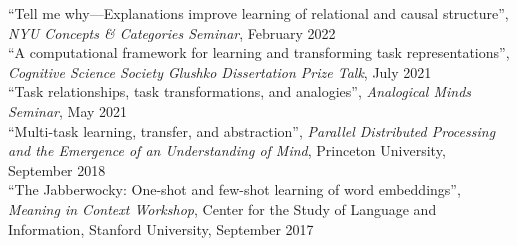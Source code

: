 \documentclass[margin]{res}
\begin{document}
\begin{resume}
{``Tell me why---Explanations improve learning of relational and causal structure'',} \textit{NYU Concepts \& Categories Seminar}, February 2022\\[3pt] 
{``A computational framework for learning and transforming task representations'',} \textit{Cognitive Science Society Glushko Dissertation Prize Talk}, July 2021\\[3pt] 
{``Task relationships, task transformations, and analogies'',} \textit{Analogical Minds Seminar}, May 2021\\[3pt] 
{``Multi-task learning, transfer, and abstraction'',} \textit{Parallel Distributed Processing and the Emergence of an Understanding of Mind}, Princeton University, September 2018\\[3pt] 
{``The Jabberwocky: One-shot and few-shot learning of word embeddings'',} \textit{Meaning in Context Workshop}, Center for the Study of Language and Information,  Stanford University, September 2017 
 


\end{resume}
\end{document}

